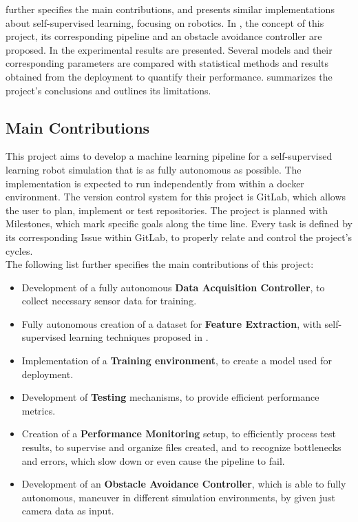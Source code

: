  further specifies the main contributions, and  presents similar implementations about self-supervised learning, focusing on robotics. In , the concept of this project, its corresponding pipeline and an obstacle avoidance controller are proposed. In  the experimental results are presented. Several models and their corresponding parameters are compared with statistical methods and results obtained from the deployment to quantify their performance.  summarizes the project's conclusions and outlines its limitations.

\subsection{Main Contributions \label{MainContributions} }
This project aims to develop a machine learning pipeline for a self-supervised learning robot simulation that is as fully autonomous as possible. The implementation is expected to run independently from within a docker environment. The version control system for this project is GitLab, which allows the user to plan, implement or test repositories. The project is planned with Milestones, which mark specific goals along the time line. Every task is defined by its corresponding Issue within GitLab, to properly relate and control the project's cycles.\\

The following list further specifies the main contributions of this project:
\begin{itemize}

\item Development of a fully autonomous \textbf{Data Acquisition Controller}, to collect necessary sensor data for training.

\item Fully autonomous creation of a dataset for \textbf{Feature Extraction}, with self-supervised learning techniques proposed in \cite{nava2019learning}.

\item Implementation of a \textbf{Training environment}, to create a model used for deployment.

\item Development of \textbf{Testing} mechanisms, to provide efficient performance metrics.

\item Creation of a \textbf{Performance Monitoring} setup, to efficiently process test results, to supervise and organize files created, and to recognize bottlenecks and errors, which slow down or even cause the pipeline to fail.

\item Development of an \textbf{Obstacle Avoidance Controller}, which is able to fully autonomous, maneuver in different simulation environments, by given just camera data as input. 

\end{itemize}

